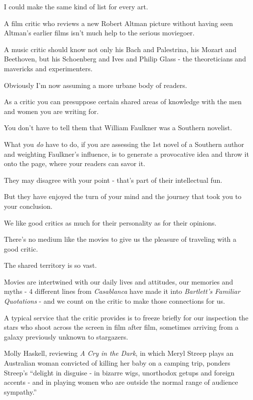 \documentclass{book}
\numberwithin{equation}{section}
\begin{document}
%
I could make the same kind of list for every art.

A film critic who reviews a new Robert Altman picture without having seen Altman's earlier films isn't much help to the serious moviegoer.

A music critic should know not only his Bach and Palestrina, his Mozart and Beethoven, but his Schoenberg and Ives and Philip Glass - the theoreticians and mavericks and experimenters.

Obviously I'm now assuming a more urbane body of readers.

As a critic you can presuppose certain shared areas of knowledge with the men and women you are writing for.

You don't have to tell them that William Faulkner was a Southern novelist.

What you \textit{do} have to do, if you are assessing the 1st novel of a Southern author and weighting Faulkner's influence, is to generate a provocative idea and throw it onto the page, where your readers can savor it.

They may disagree with your point - that's part of their intellectual fun.

But they have enjoyed the turn of your mind and the journey that took you to your conclusion.

We like good critics as much for their personality as for their opinions.

%
There's no medium like the movies to give us the pleasure of traveling with a good critic.

The shared territory is so vast.

Movies are intertwined with our daily lives and attitudes, our memories and myths - 4 different lines from \textit{Casablanca} have made it into \textit{Bartlett's Familiar Quotations} - and we count on the critic to make those connections for us.

A typical service that the critic provides is to freeze briefly for our inspection the stars who shoot across the screen in film after film, sometimes arriving from a galaxy previously unknown to stargazers.

Molly Haskell, reviewing \textit{A Cry in the Dark}, in which Meryl Streep plays an Australian woman convicted of killing her baby on a camping trip, ponders Streep's ``delight in disguise - in bizarre wigs, unorthodox getups and foreign accents - and in playing women who are outside the normal range of audience sympathy.''
\end{document}
